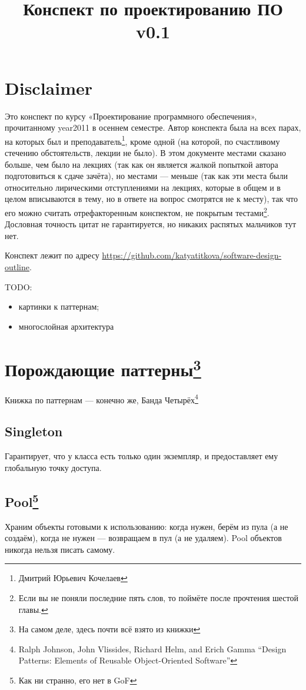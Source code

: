 \documentclass[11pt,a4paper]{article}
\title{Конспект по проектированию ПО \\ \vspace{2 mm} {\large v0.1}}
\date{}
\begin{document}
\maketitle
\tableofcontents

\section{Disclaimer}
Это конспект по курсу «Проектирование программного обеспечения», прочитанному year2011 в осеннем семестре. Автор конспекта была на всех парах, на которых был и преподаватель\footnote{Дмитрий Юрьевич Кочелаев}, кроме одной (на которой, по счастливому стечению обстоятельств, лекции не было). В этом документе местами сказано больше, чем было на лекциях (так как он является жалкой попыткой автора подготовиться к сдаче зачёта), но местами — меньше (так как эти места были относительно лирическими отступлениями на лекциях, которые в общем и в целом вписываются в тему, но в ответе на вопрос смотрятся не к месту), так что его можно считать отрефакторенным конспектом, не покрытым тестами\footnote{Если вы не поняли последние пять слов, то поймёте после прочтения шестой главы.}. Дословная точность цитат не гарантируется, но никаких распятых мальчиков тут нет.

Конспект лежит по адресу \url{https://github.com/katyatitkova/software-design-outline}.

TODO: 
\begin{itemize}
\item картинки к паттернам;
\item многослойная архитектура
\end{itemize}

\section{Порождающие паттерны\footnote{На самом деле, здесь почти всё взято из книжки}}
Книжка по паттернам — конечно же, Банда Четырёх\footnote{Ralph Johnson, John Vlissides, Richard Helm, and Erich Gamma ``Design Patterns: Elements of Reusable Object-Oriented Software''}
\subsection{Singleton}
Гарантирует, что у класса есть только один экземпляр, и предоставляет ему глобальную точку доступа.

\subsection{Pool\footnote{Как ни странно, его нет в GoF}}
Храним объекты готовыми к использованию: когда нужен, берём из пула (а не создаём), когда не нужен — возвращаем в пул (а не удаляем). Pool объектов никогда нельзя писать самому.
\end{document}
